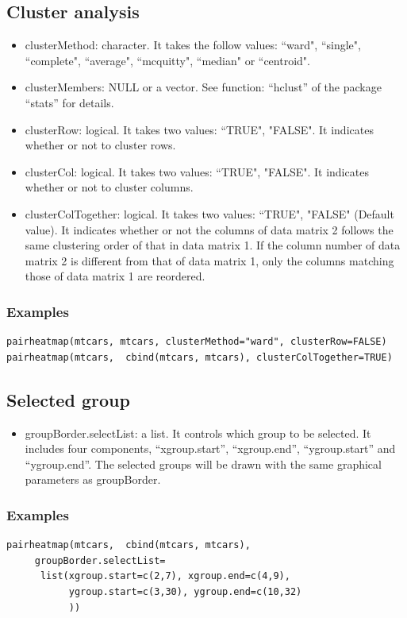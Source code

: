 \documentclass[a4paper]{article}
\begin{document}
\subsection{Cluster analysis}
\begin{itemize}
	\item clusterMethod: character. It takes the follow values: ``ward", ``single", ``complete", ``average", ``mcquitty", ``median" or ``centroid".
	\item clusterMembers: NULL or a vector. See function: ``hclust'' of the package ``stats'' for details.
	\item clusterRow: logical. It takes two values: ``TRUE", "FALSE". It indicates whether or not to cluster rows.
	\item clusterCol: logical. It takes two values: ``TRUE", "FALSE". It indicates whether or not to cluster columns.
	\item clusterColTogether: logical. It takes two values: ``TRUE", "FALSE" (Default value). It indicates whether or not the columns of data matrix 2 follows the same clustering order of that in data matrix 1. If the column number of data matrix 2 is different from that of data matrix 1, only the columns matching those of data matrix 1 are reordered.	
	\end{itemize}
\subsubsection{Examples}
\begin{verbatim}
pairheatmap(mtcars, mtcars, clusterMethod="ward", clusterRow=FALSE)
pairheatmap(mtcars,  cbind(mtcars, mtcars), clusterColTogether=TRUE)
\end{verbatim}
\subsection{Selected group}
\begin{itemize}
	\item groupBorder.selectList: a list. It controls which group to be selected. It includes four components, ``xgroup.start'', ``xgroup.end'', ``ygroup.start'' and ``ygroup.end''.  The selected groups will be drawn with the same graphical parameters as groupBorder.
\end{itemize}
\subsubsection{Examples}
\begin{verbatim}
pairheatmap(mtcars,  cbind(mtcars, mtcars),
     groupBorder.selectList=
      list(xgroup.start=c(2,7), xgroup.end=c(4,9),
           ygroup.start=c(3,30), ygroup.end=c(10,32)
           ))
\end{verbatim}
\end{document}

